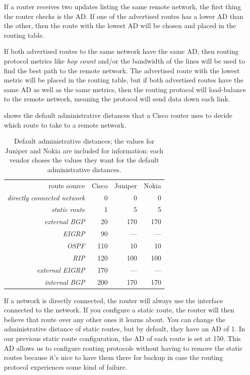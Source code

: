 If a router receives two updates listing the same remote network, the first thing the router checks is the AD.
If one of the advertised routes has a lower AD than the other, then the route with the lowest AD will be chosen and placed in the routing table.

If both advertised routes to the same network have the same AD, then routing protocol metrics like \emph{hop count} and/or the bandwidth of
the lines will be used to find the best path to the remote network.
The advertised route with the lowest metric will be placed in the routing table, but if both advertised routes have the same AD as well as the
same metrics, then the routing protocol will load-balance to the remote network, meaning the protocol will send data down each link.

 shows the default administrative distances that a Cisco router uses to decide which route to take to a remote network.


\begin{table}
   \centering
   \begin{tabular}{rrrr}
   route source                        & Cisco & Juniper & Nokia \\[1ex]
   \textit{directly connected network} &     0 &       0 &     0 \\
   \textit{static route}               &     1 &       5 &     5 \\
   \textit{external BGP}               &    20 &     170 &   170 \\
   \textit{EIGRP}                      &    90 &     --- &   --- \\
   \textit{OSPF}                       &   110 &      10 &    10 \\
   \textit{RIP}                        &   120 &     100 &   100 \\
   \textit{external EIGRP}             &   170 &     --- &   --- \\
   \textit{internal BGP}               &   200 &     170 &   170 \\
   \end{tabular}
   \caption{Default administrative distances; the values for Juniper and Nokia are included for information: each vendor choses the values they want for the default administrative distances.}
   \label{tab:default-ad}
\end{table}

If a network is directly connected, the router will always use the interface connected to the network.
If you configure a static route, the router will then believe that route over any other ones it learns about.
You can change the administrative distance of static routes, but by default, they have an AD of 1.
In our previous static route configuration, the AD of each route is set at 150.
This AD allows us to configure routing protocols without having to remove the static routes because it's nice to have them there for backup in case the routing
protocol experiences some kind of failure.

